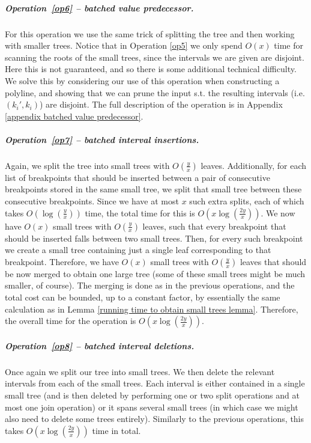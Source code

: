 \documentclass[a4paper,UKenglish]{lipics-v2016}
\theoremstyle{plain}
\renewcommand{\paragraph}{\subparagraph}
\begin{document}
\paragraph{Operation~\ref{op6} -- batched value predecessor.}
For this operation we use the same trick of splitting the tree and then working with smaller trees. Notice that in Operation \ref{op5} we only spend $O(x)$ time for scanning the roots of the small trees, since the intervals we are given are disjoint. Here this is not guaranteed, and so there is some additional technical difficulty. We solve this by considering our use of this operation when constructing a polyline, and showing that we can prune the input s.t. the resulting intervals (i.e. $(k_i',k_i)$) are disjoint. The full description of the operation is in Appendix \ref{appendix batched value predecessor}.

\paragraph{Operation~\ref{op7} -- batched interval insertions.}
Again, we split the tree into small trees with $O(\frac{y}{x})$ leaves. Additionally, for each list of breakpoints that should be inserted between a pair of consecutive breakpoints stored in the same small tree, we split that small tree between these consecutive breakpoints.
Since we have at most $x$ such extra splits, each of which takes $O(\log(\frac{y}{x}))$ time, the total time for this is $O(x\log(\frac{2y}{x}))$. We now have $O(x)$ small trees with $O(\frac{y}{x})$ leaves, such that every breakpoint
that should be inserted falls between two small trees.
Then, for every such breakpoint we create a small tree containing just a single leaf corresponding to that
breakpoint. Therefore, we have $O(x)$ small trees with $O(\frac{y}{x})$ leaves that should be now merged
to obtain one large tree (some of these small trees might be much smaller, of course).
The merging is done as in the previous operations, and the total cost can be bounded,
up to a constant factor, by essentially the same calculation as in Lemma \ref{running time to obtain small trees lemma}. Therefore, the overall time for the operation is $O(x \log(\frac{2y}{x}))$.

\paragraph{Operation~\ref{op8} -- batched interval deletions.}
Once again we split our tree into small trees. We then delete the relevant intervals from each of the small trees. Each interval is either contained in a single small tree (and is then deleted by performing one or two split operations and at most one join operation) or it spans several small trees (in which case we might also need to delete some trees entirely). Similarly to the previous operations, this takes $O(x \log(\frac{2y}{x}))$ time in total.
\end{document}
